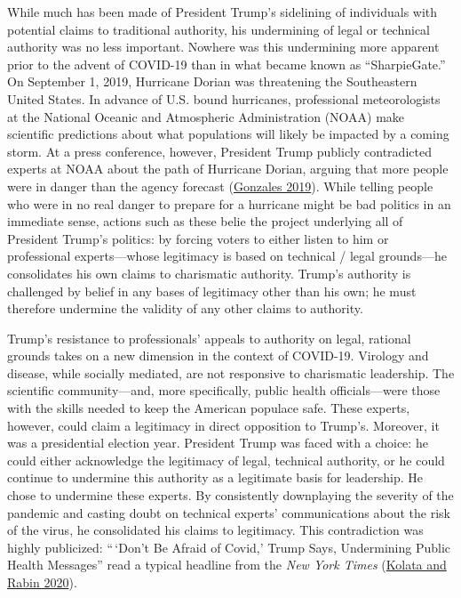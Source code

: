 \documentclass[
  12pt,
]{article}
\begin{document}
While much has been made of President Trump's sidelining of individuals with potential claims to traditional authority, his undermining of legal or technical authority was no less important. Nowhere was this undermining more apparent prior to the advent of COVID-19 than in what became known as ``SharpieGate.'' On September 1, 2019, Hurricane Dorian was threatening the Southeastern United States. In advance of U.S. bound hurricanes, professional meteorologists at the National Oceanic and Atmospheric Administration (NOAA) make scientific predictions about what populations will likely be impacted by a coming storm. At a press conference, however, President Trump publicly contradicted experts at NOAA about the path of Hurricane Dorian, arguing that more people were in danger than the agency forecast (\protect\hyperlink{ref-Gonzales2019}{Gonzales 2019}). While telling people who were in no real danger to prepare for a hurricane might be bad politics in an immediate sense, actions such as these belie the project underlying all of President Trump's politics: by forcing voters to either listen to him or professional experts---whose legitimacy is based on technical / legal grounds---he consolidates his own claims to charismatic authority. Trump's authority is challenged by belief in any bases of legitimacy other than his own; he must therefore undermine the validity of any other claims to authority.

Trump's resistance to professionals' appeals to authority on legal, rational grounds takes on a new dimension in the context of COVID-19. Virology and disease, while socially mediated, are not responsive to charismatic leadership. The scientific community---and, more specifically, public health officials---were those with the skills needed to keep the American populace safe. These experts, however, could claim a legitimacy in direct opposition to Trump's. Moreover, it was a presidential election year. President Trump was faced with a choice: he could either acknowledge the legitimacy of legal, technical authority, or he could continue to undermine this authority as a legitimate basis for leadership. He chose to undermine these experts. By consistently downplaying the severity of the pandemic and casting doubt on technical experts' communications about the risk of the virus, he consolidated his claims to legitimacy. This contradiction was highly publicized: ``\,`Don't Be Afraid of Covid,' Trump Says, Undermining Public Health Messages'' read a typical headline from the \emph{New York Times} (\protect\hyperlink{ref-Kolata2020}{Kolata and Rabin 2020}).
\end{document}
